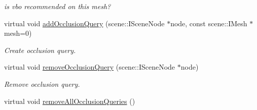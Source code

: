 \begin{DoxyCompactItemize}
\begin{DoxyCompactList}\small\item\em is vbo recommended on this mesh? \end{DoxyCompactList}\item 
virtual void \hyperlink{classirr_1_1video_1_1_c_null_driver_a2fbaa471f9eb0f6b61dd7df2f08c604e}{add\-Occlusion\-Query} (scene\-::\-I\-Scene\-Node $\ast$node, const scene\-::\-I\-Mesh $\ast$mesh=0)
\begin{DoxyCompactList}\small\item\em Create occlusion query. \end{DoxyCompactList}\item 
\hypertarget{classirr_1_1video_1_1_c_null_driver_a9246d45cc73096cce552d15772bf0e5e}{virtual void \hyperlink{classirr_1_1video_1_1_c_null_driver_a9246d45cc73096cce552d15772bf0e5e}{remove\-Occlusion\-Query} (scene\-::\-I\-Scene\-Node $\ast$node)}\label{classirr_1_1video_1_1_c_null_driver_a9246d45cc73096cce552d15772bf0e5e}

\begin{DoxyCompactList}\small\item\em Remove occlusion query. \end{DoxyCompactList}\item 
\hypertarget{classirr_1_1video_1_1_c_null_driver_a7ce5772ee1d1a88f6cc194c16af93071}{virtual void \hyperlink{classirr_1_1video_1_1_c_null_driver_a7ce5772ee1d1a88f6cc194c16af93071}{remove\-All\-Occlusion\-Queries} ()}\label{classirr_1_1video_1_1_c_null_driver_a7ce5772ee1d1a88f6cc194c16af93071}


\end{DoxyCompactItemize}
